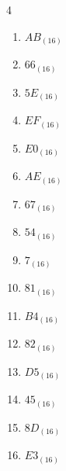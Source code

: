 \begin{multicols}{4}
\begin{enumerate}
  \item $AB_{(16)}$

        \phantom{$=171$}

  \item $66_{(16)}$

        \phantom{$=102$}

  \item $5E_{(16)}$

        \phantom{$=94$}

  \item $EF_{(16)}$

        \phantom{$=239$}

\columnbreak %

  \item $E0_{(16)}$

        \phantom{$=224$}

  \item $AE_{(16)}$

        \phantom{$=174$}

  \item $67_{(16)}$

        \phantom{$=103$}

  \item $54_{(16)}$

        \phantom{$=84$}

  \item $7_{(16)}$

        \phantom{$=7$}

  \item $81_{(16)}$

        \phantom{$=129$}

  \item $B4_{(16)}$

        \phantom{$=180$}

  \item $82_{(16)}$

        \phantom{$=130$}

  \item $D5_{(16)}$

        \phantom{$=213$}

  \item $45_{(16)}$

        \phantom{$=69$}

  \item $8D_{(16)}$

        \phantom{$=141$}

  \item $E3_{(16)}$


\end{enumerate}
\end{multicols}
